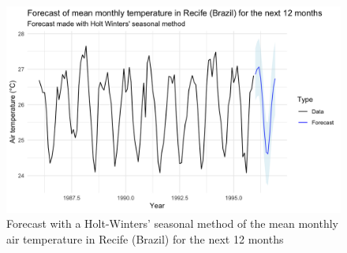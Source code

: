 \begin{figure}[H]
	\centering
	\includegraphics{figures/forecast/hw_forecast.png}
	\caption{Forecast with a Holt-Winters' seasonal method of the mean monthly air temperature in Recife (Brazil) for the next 12 months}
	\label{fig:hw-forecast}
\end{figure}